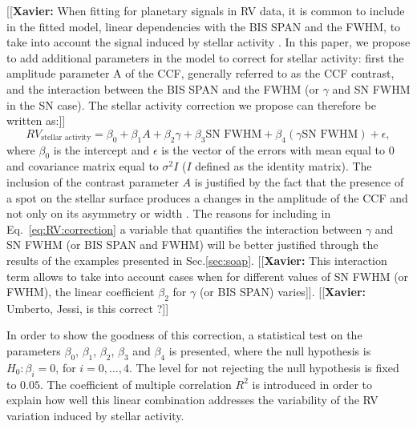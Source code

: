 \documentclass{aa}
\def\logrhk{$\log$(R$^{\prime}_{HK}$)}
\newcommand{\xavier}[1]{{\color{blue}[[\textbf{Xavier: }#1]]}}
\begin{document}
\xavier{When fitting for planetary signals in RV data, it is common to include in the fitted model, linear dependencies with the BIS SPAN and the FWHM, to take into account the signal induced by stellar activity \citep[e.g.][]{Dumusque:2017aa,Feng:2017aa}.
In this paper, we propose to add additional parameters in the model to correct for stellar activity: first the amplitude parameter A of the CCF, generally referred to as the CCF contrast, and the interaction between the BIS SPAN and the FWHM (or $\gamma$ and SN FWHM in the SN case). The stellar activity correction we propose can therefore be written as:}
%
\begin{equation}
RV_{\text{stellar activity}}= \beta_{0} + \beta_{1} A + \beta_{2} \gamma + \beta_{3} \text{SN FWHM} + \beta_{4} (\gamma  \text{SN FWHM})+\epsilon,
\label{eq:RV:correction}
\end{equation}
%
where $\beta_{0}$ is the intercept and $\epsilon$ is the vector of the errors with mean equal to $0$ and covariance matrix equal to $\sigma^{2}I$ ($I$ defined as the identity matrix). 
The inclusion of the contrast parameter $A$ is justified by the fact that the presence of a spot on the stellar surface produces a changes in the amplitude of the CCF and not only on its asymmetry or width \citep[see e.g. Fig. 2 in ][]{Dumusque-2014b}.
The reasons for including in Eq.~\ref{eq:RV:correction} a variable that quantifies the interaction between $\gamma$ and SN FWHM (or BIS SPAN and FWHM) will be better justified through the results of the examples presented in Sec.\ref{sec:soap}. 
\xavier{This interaction term allows to take into account cases when for different values of SN FWHM (or FWHM), the linear coefficient $\beta_{2}$ for $\gamma$ (or BIS SPAN) varies}. \xavier{Umberto, Jessi, is this correct ?}

In order to show the goodness of this correction, a statistical test on the parameters $\beta_{0}$, $\beta_{1}$, $\beta_{2}$, $\beta_{3}$ and $\beta_{4}$ is presented, where the null hypothesis is $H_{0}: \beta_{i}=0$, for $i=0,\dots,4$. The level for not rejecting the null hypothesis is fixed to $0.05$. The coefficient of multiple correlation $R^2$ is introduced in order to explain how well this linear combination addresses the variability of the RV variation induced by stellar activity. 
\end{document}
